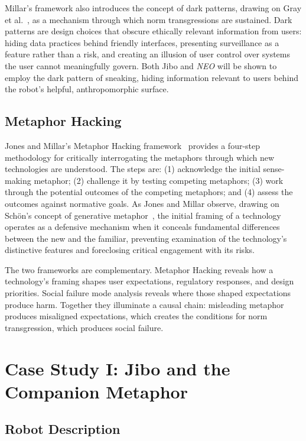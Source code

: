 \documentclass{ieee-portfolio}
\newcommand{\neo}{\textit{NEO}}
\begin{document}
Millar's framework also introduces the concept of dark patterns, drawing on Gray et al.~\cite{gray_dark_2018}, as a mechanism through which norm transgressions are sustained. Dark patterns are design choices that obscure ethically relevant information from users: hiding data practices behind friendly interfaces, presenting surveillance as a feature rather than a risk, and creating an illusion of user control over systems the user cannot meaningfully govern. Both Jibo and \neo{} will be shown to employ the dark pattern of sneaking, hiding information relevant to users behind the robot's helpful, anthropomorphic surface.

\subsection{Metaphor Hacking}

Jones and Millar's Metaphor Hacking framework~\cite{jones_hacking_2017} provides a four-step methodology for critically interrogating the metaphors through which new technologies are understood. The steps are: (1) acknowledge the initial sense-making metaphor; (2) challenge it by testing competing metaphors; (3) work through the potential outcomes of the competing metaphors; and (4) assess the outcomes against normative goals. As Jones and Millar observe, drawing on Sch\"{o}n's concept of generative metaphor~\cite{schon_generative_1993}, the initial framing of a technology operates as a defensive mechanism when it conceals fundamental differences between the new and the familiar, preventing examination of the technology's distinctive features and foreclosing critical engagement with its risks.

The two frameworks are complementary. Metaphor Hacking reveals how a technology's framing shapes user expectations, regulatory responses, and design priorities. Social failure mode analysis reveals where those shaped expectations produce harm. Together they illuminate a causal chain: misleading metaphor produces misaligned expectations, which creates the conditions for norm transgression, which produces social failure.

\section{Case Study I: Jibo and the Companion Metaphor}
\label{sec:jibo}

\subsection{Robot Description}
\end{document}
